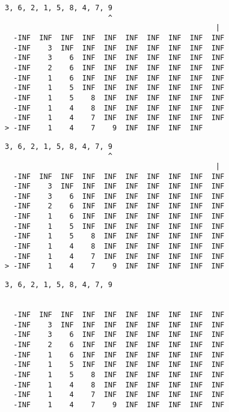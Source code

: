 { \begin{verbatim}
3, 6, 2, 1, 5, 8, 4, 7, 9
                        ^
                                                 |
  -INF  INF  INF  INF  INF  INF  INF  INF  INF  INF
  -INF    3  INF  INF  INF  INF  INF  INF  INF  INF
  -INF    3    6  INF  INF  INF  INF  INF  INF  INF
  -INF    2    6  INF  INF  INF  INF  INF  INF  INF
  -INF    1    6  INF  INF  INF  INF  INF  INF  INF
  -INF    1    5  INF  INF  INF  INF  INF  INF  INF
  -INF    1    5    8  INF  INF  INF  INF  INF  INF
  -INF    1    4    8  INF  INF  INF  INF  INF  INF
  -INF    1    4    7  INF  INF  INF  INF  INF  INF
> -INF    1    4    7    9  INF  INF  INF  INF     
\end{verbatim} }

{ \begin{verbatim}
3, 6, 2, 1, 5, 8, 4, 7, 9
                        ^
                                                 |
  -INF  INF  INF  INF  INF  INF  INF  INF  INF  INF
  -INF    3  INF  INF  INF  INF  INF  INF  INF  INF
  -INF    3    6  INF  INF  INF  INF  INF  INF  INF
  -INF    2    6  INF  INF  INF  INF  INF  INF  INF
  -INF    1    6  INF  INF  INF  INF  INF  INF  INF
  -INF    1    5  INF  INF  INF  INF  INF  INF  INF
  -INF    1    5    8  INF  INF  INF  INF  INF  INF
  -INF    1    4    8  INF  INF  INF  INF  INF  INF
  -INF    1    4    7  INF  INF  INF  INF  INF  INF
> -INF    1    4    7    9  INF  INF  INF  INF  INF
\end{verbatim} }

{ \begin{verbatim}
3, 6, 2, 1, 5, 8, 4, 7, 9


  -INF  INF  INF  INF  INF  INF  INF  INF  INF  INF
  -INF    3  INF  INF  INF  INF  INF  INF  INF  INF
  -INF    3    6  INF  INF  INF  INF  INF  INF  INF
  -INF    2    6  INF  INF  INF  INF  INF  INF  INF
  -INF    1    6  INF  INF  INF  INF  INF  INF  INF
  -INF    1    5  INF  INF  INF  INF  INF  INF  INF
  -INF    1    5    8  INF  INF  INF  INF  INF  INF
  -INF    1    4    8  INF  INF  INF  INF  INF  INF
  -INF    1    4    7  INF  INF  INF  INF  INF  INF
  -INF    1    4    7    9  INF  INF  INF  INF  INF
\end{verbatim} }

